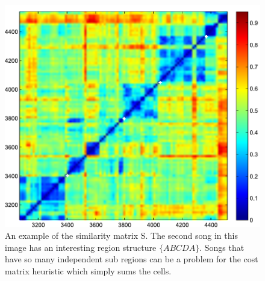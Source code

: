 \documentclass[twocolumn]{article}
\begin{document}
\begin{figure}[htb]
\centering
  \includegraphics[width= \linewidth]{images/simmat_nopreds.pdf}
      \caption{An example of the similarity matrix S. The second song in this image has an interesting region structure $\{ABCDA\}$. Songs that have so many independent sub regions can be a problem for the cost matrix heuristic which simply sums the cells.}
    \end{figure}
    
\end{document}

